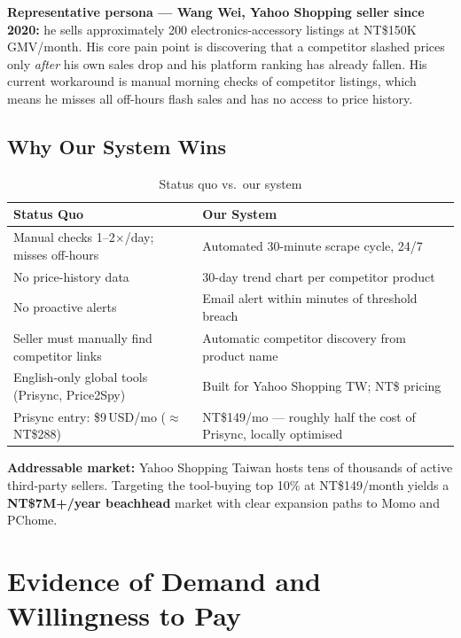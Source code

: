 \documentclass[11pt,a4paper]{article}
\begin{document}
\textbf{Representative persona --- Wang Wei, Yahoo Shopping seller since 2020:}
he sells approximately 200 electronics-accessory listings at NT\$150K GMV/month.
His core pain point is discovering that a competitor slashed prices only
\emph{after} his own sales drop and his platform ranking has already fallen.
His current workaround is manual morning checks of competitor listings,
which means he misses all off-hours flash sales and has no access to price history.

\subsection{Why Our System Wins}

\begin{table}[H]
\centering\small\renewcommand{\arraystretch}{1.25}
\begin{tabularx}{\textwidth}{X X}
\toprule
\textbf{Status Quo} & \textbf{Our System} \\
\midrule
Manual checks 1--2$\times$/day; misses off-hours
  & Automated 30-minute scrape cycle, 24/7 \\
No price-history data
  & 30-day trend chart per competitor product \\
No proactive alerts
  & Email alert within minutes of threshold breach \\
Seller must manually find competitor links
  & Automatic competitor discovery from product name \\
English-only global tools (Prisync, Price2Spy)
  & Built for Yahoo Shopping TW; NT\$ pricing \\
Prisync entry: \$9\,USD/mo ($\approx$NT\$288)
  & NT\$149/mo --- roughly half the cost of Prisync, locally optimised \\
\bottomrule
\end{tabularx}
\caption{Status quo vs.\ our system}
\end{table}

\textbf{Addressable market:} Yahoo Shopping Taiwan hosts tens of thousands of
active third-party sellers. Targeting the tool-buying top 10\% at NT\$149/month
yields a \textbf{NT\$7M+/year beachhead} market with clear expansion paths
to Momo and PChome.

\section{Evidence of Demand and Willingness to Pay}
\end{document}
